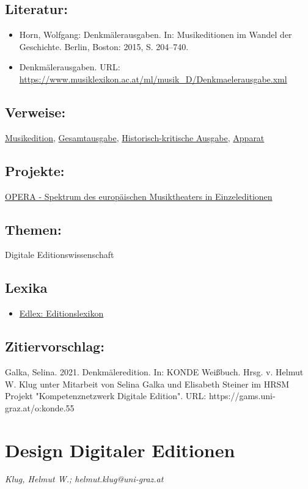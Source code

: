 \documentclass{article}
\begin{document}
        \subsection*{Literatur:}\begin{itemize}\item Horn, Wolfgang: Denkmälerausgaben. In: Musikeditionen im Wandel der Geschichte. Berlin, Boston: 2015, S. 204–740.\item Denkmälerausgaben. URL: \url{https://www.musiklexikon.ac.at/ml/musik_D/Denkmaelerausgabe.xml}\end{itemize}\subsection*{Verweise:}\href{https://gams.uni-graz.at/o:konde.139}{Musikedition}, \href{https://gams.uni-graz.at/o:konde.91}{Gesamtausgabe}, \href{https://gams.uni-graz.at/o:konde.93}{Historisch-kritische Ausgabe}, \href{https://gams.uni-graz.at/o:konde.32}{Apparat}\subsection*{Projekte:}\href{http://www.opera.adwmainz.de/informationen.html}{OPERA - Spektrum
                           des europäischen Musiktheaters in Einzeleditionen}\subsection*{Themen:}Digitale Editionswissenschaft\subsection*{Lexika}\begin{itemize}\item \href{https://edlex.de/index.php?title=Denkm%C3%A4leredition}{Edlex:
                           Editionslexikon}\end{itemize}\subsection*{Zitiervorschlag:}Galka, Selina. 2021. Denkmäleredition. In: KONDE Weißbuch. Hrsg. v. Helmut W. Klug unter Mitarbeit von Selina Galka und Elisabeth Steiner im HRSM Projekt "Kompetenznetzwerk Digitale Edition". URL: https://gams.uni-graz.at/o:konde.55\newpage\section*{Design Digitaler Editionen} \emph{Klug, Helmut W.; helmut.klug@uni-graz.at }\\
        
\end{document}
